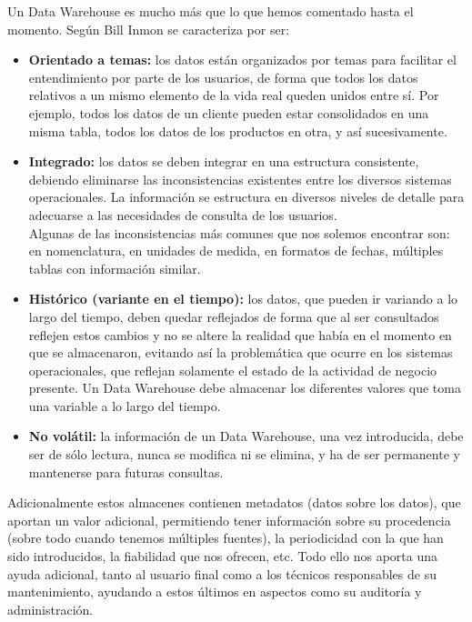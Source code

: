 \documentclass[%
 reprint,
 amsmath,amssymb,
 aps,
]{revtex4-1}
\begin{document}
Un Data Warehouse es mucho más que lo que hemos comentado hasta el momento. Según Bill Inmon se caracteriza por ser:
\begin{itemize}
	\item \textbf{Orientado a temas:}  los datos están organizados por temas para facilitar el entendimiento por parte de los usuarios, de forma que todos los datos relativos a un mismo elemento de la vida real queden unidos entre sí. Por ejemplo, todos los datos de un cliente pueden estar consolidados en una misma tabla, todos los datos de los productos en otra, y así sucesivamente.
	\item \textbf{Integrado:}  los datos se deben integrar en una estructura consistente, debiendo eliminarse las inconsistencias existentes entre los diversos sistemas operacionales. La información se estructura en diversos niveles de detalle para adecuarse a las necesidades de consulta de los usuarios. \\Algunas de las inconsistencias más comunes que nos solemos encontrar son: en nomenclatura, en unidades de medida, en formatos de fechas, múltiples
	tablas con información similar.
	\item \textbf{Histórico (variante en el tiempo):}   los datos, que pueden ir variando a lo largo del tiempo, deben quedar reflejados de forma que al ser consultados reflejen estos cambios y no se altere la realidad que había en el momento en que se almacenaron, evitando así la problemática que ocurre en los sistemas operacionales, que reflejan solamente el estado de la actividad de negocio presente. Un Data Warehouse debe almacenar los diferentes valores que
toma una variable a lo largo del tiempo. 
	\item \textbf{No volátil:}   la información de un Data Warehouse, una vez introducida, debe ser de sólo lectura, nunca se modifica ni se elimina, y ha de ser permanente y  mantenerse para futuras consultas. \cite{referenciaestrella1}\\
\end{itemize}

Adicionalmente estos almacenes contienen metadatos (datos sobre los datos), que aportan un valor adicional, permitiendo tener información sobre su procedencia (sobre todo cuando tenemos múltiples fuentes), la periodicidad con la que han sido introducidos, la fiabilidad que nos ofrecen, etc. Todo ello nos aporta una ayuda adicional, tanto al usuario final como a los técnicos responsables de su mantenimiento, ayudando a estos últimos en aspectos como su auditoría y administración. \\
\end{document}
